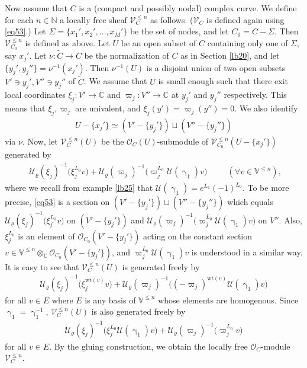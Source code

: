 \documentclass[12pt,b5paper,notitlepage]{report}
\theoremstyle{definition}
\theoremstyle{plain}
\newcommand{\mc}{\mathcal}
\newcommand{\wtd}{\widetilde}
\newcommand{\scr}{\mathscr}
\newcommand{\mbb}{\mathbb}
\newcommand{\Vbb}{\mathbb V}
\newcommand{\Cbb}{\mathbb C}
\newcommand{\Nbb}{\mathbb N}
\newcommand{\wt}{\mathrm{wt}}
\numberwithin{equation}{section}
\begin{document}
Now assume that $C$ is a (compact and possibly nodal) complex curve. We define for each $n\in\Nbb$ a locally free sheaf $\scr V_C^{\leq n}$ as follows. ($\scr V_C$ is defined again using \eqref{eq53}.) Let $\Sigma=\{x_1',x_2',\dots,x_M'\}$ be the set of nodes, and let $C_0=C-\Sigma$. Then $\scr V_{C_0}^{\leq n}$ is defined as above. Let $U$ be an open subset of $C$ containing only one of $\Sigma$, say $x_j'$. Let $\nu:\wtd C\rightarrow C$ be the normalization of $C$ as in Section \ref{lb20}, and let $\{y_j',y_j''\}=\nu^{-1}(x_j')$. Then $\nu^{-1}(U)$ is a disjoint union of two open subsets $V'\ni y_j',V''\ni y_j''$ of $\wtd C$. We assume that $U$ is small enough such that there exit local coordinates $\xi_j:V'\rightarrow\mbb C$ and $\varpi_j:V''\rightarrow\mbb C$ at $y_j'$ and $y_j''$ respectively. This means that $\xi_j,\varpi_j$ are univalent, and $\xi_j(y')=\varpi_j(y'')=0$. We also identify
\begin{align}
U-\{x_j'\} \simeq (V'-\{y_j'\})\sqcup (V''-\{y_j''\})
\end{align}
via $\nu$. Now, let $\scr V_C^{\leq n}(U)$ be the $\scr O_C(U)$-submodule of $\scr V_{C_0}^{\leq n}(U-\{x_j'\})$ generated by
\begin{align}
\boxed{~~\mc U_\varrho(\xi_j)^{-1}\big(\xi_j^{L_0}v\big)+\mc U_\varrho(\varpi_j)^{-1}\big(\varpi_j^{L_0}\mc U(\upgamma_1)v\big)~~}\qquad (\forall v\in\Vbb^{\leq n}),\label{eq54}
\end{align}
where we recall from example \ref{lb25} that $\mc U(\upgamma_1)=e^{L_1}(-1)^{L_0}$. To be more precise, \eqref{eq53} is a section on $(V'-\{y_j'\})\sqcup (V''-\{y_j''\})$ which equals $\mc U_\varrho(\xi_j)^{-1}\big(\xi_j^{L_0}v\big)$ on $(V'-\{y_j'\})$ and $\mc U_\varrho(\varpi_j)^{-1}\big(\varpi_j^{L_0}\mc U(\upgamma_1)v\big)$ on $V''$. Also, $\xi_j^{L_0}$ is an element of $\scr O_{C_0}(V'-\{y_j'\})$ acting on the constant section $v\in\Vbb^{\leq n}\otimes_{\Cbb}\scr O_{C_0}(V'-\{y_j'\})$, and $\varpi_j^{L_0}\mc U(\upgamma_1)v$ is understood in a similar way.  It is easy to see that $\scr V_C^{\leq n}(U)$ is generated freely by
\begin{align}
\mc U_\varrho(\xi_j)^{-1}\big(\xi_j^{\wt (v)}v\big)+\mc U_\varrho(\varpi_j)^{-1}\big((-\varpi_j)^{\wt(v)}\mc U(\upgamma_1)v\big)\label{eq225}
\end{align}
for all $v\in E$ where $E$ is any basis of $\Vbb^{\leq n}$ whose elements are homogenous. Since $\upgamma_1=\upgamma_1^{-1}$, $\scr V_C^{\leq n}(U)$ is also generated freely by
\begin{align*}
\mc U_\varrho(\xi_j)^{-1}\big(\xi_j^{L_0}\mc U(\upgamma_1)v\big)+\mc U_\varrho(\varpi_j)^{-1}\big(\varpi_j^{L_0}v\big)
\end{align*}
for all $v\in E$. By the gluing construction, we obtain the locally free $\scr O_C$-module $\scr V_C^{\leq n}$.
\end{document}

